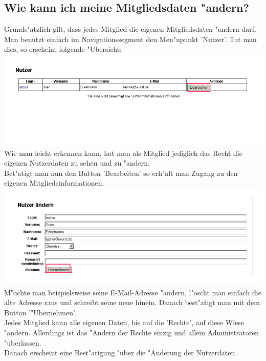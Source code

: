 \subsection{Wie kann ich meine Mitgliedsdaten "andern?}
Grunds"atzlich gilt, dass jedes Mitglied die eigenen Mitgliedsdaten "andern darf.\\ Man benutzt einfach im Navigationssegment den Men"upunkt 'Nutzer'. Tut man dies, so erscheint folgende "Ubersicht:\\
\includegraphics[scale=0.8]{nutzer1}\\
Wie man leicht erkennen kann, hat man als Mitglied jediglich das Recht die eigenen Nutzerdaten zu sehen und zu "andern.\\
Bet"atigt man nun den Button 'Bearbeiten' so erh"alt man Zugang zu den eigenen Mitgliedsinformationen.\\
\includegraphics[scale=0.8]{nutzer2}\\
M"ochte man beispielsweise seine E-Mail-Adresse "andern, l"oscht man einfach die alte Adresse raus und schreibt seine neue hinein. Danach best"atigt man mit dem Button '"Ubernehmen'.\\
Jedes Mitglied kann alle eigenen Daten, bis auf die 'Rechte', auf diese Wiese "andern. Allerdings ist das "Andern der Rechte einzig und allein Administratoren "uberlassen.\\
Danach erscheint eine Best"atigung "uber die "Anderung der Nutzerdaten.\\

